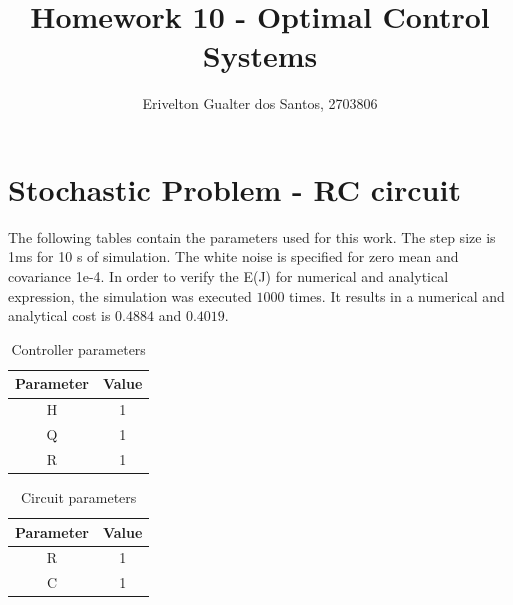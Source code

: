 \documentclass{article}
\begin{document}
\title{Homework 10 - Optimal Control Systems}
\author{Erivelton Gualter dos Santos, 2703806}
\date{}

\maketitle 

\section{Stochastic Problem - RC circuit}

The following tables contain the parameters used for this work. The step size is 1ms for 10 s of simulation. The white noise is specified for zero mean and covariance 1e-4. In order to verify the E(J) for numerical and analytical expression, the simulation was executed $1000$ times. It results in a numerical and analytical cost is $0.4884$ and $0.4019$.


\begin{table}[H]
\centering
\caption{Controller parameters}
\label{tb:controller}
\begin{tabular}{|c|c|}
\hline
Parameter & Value \\ \hline \hline
H         & 1     \\ \hline
Q         & 1     \\ \hline
R         & 1     \\ \hline
\end{tabular}
\end{table}

\begin{table}[H]
\centering
\caption{Circuit parameters}
\label{tb:circuit}
\begin{tabular}{|c|c|}
\hline
Parameter & Value \\ \hline
R         & 1     \\ \hline
C         & 1     \\ \hline
\end{tabular}
\end{table}
\end{document}
